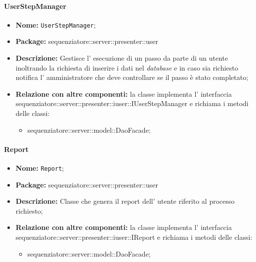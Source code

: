 \paragraph{UserStepManager}
	\begin{itemize}
		\item \textbf{Nome:} \texttt{UserStepManager};
		\item \textbf{Package:} sequenziatore::server::presenter::user
		\item \textbf{Descrizione:} Gestisce l' esecuzione di un passo da parte di un utente inoltrando la richiesta di inserire i dati nel \textit{database} e in caso sia richiesto notifica l' amministratore che deve controllare se il passo è stato completato;
		\item \textbf{Relazione con altre componenti:} la classe implementa l' interfaccia sequenziatore::server::presenter::iuser::IUserStepManager e richiama i metodi delle classi:
		\begin{itemize}
			\item sequenziatore::server::model::DaoFacade;
		\end{itemize}
	\end{itemize}
\paragraph{Report}
	\begin{itemize}
		\item \textbf{Nome:} \texttt{Report};
		\item \textbf{Package:} sequenziatore::server::presenter::user
		\item \textbf{Descrizione:} Classe che genera il report dell' utente riferito al processo richiesto;
		\item \textbf{Relazione con altre componenti:} la classe implementa l' interfaccia sequenziatore::server::presenter::iuser::IReport e richiama i metodi delle classi:
		\begin{itemize}
			\item sequenziatore::server::model::DaoFacade;
		\end{itemize}
	\end{itemize}
